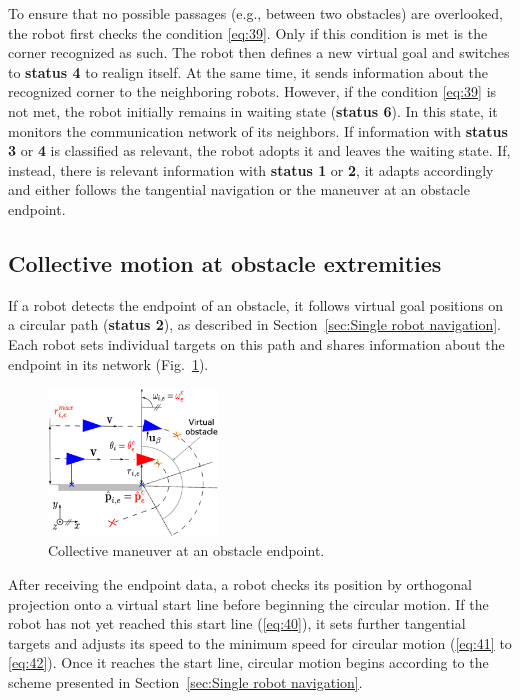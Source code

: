 \documentclass[conference]{IEEEtran}
\begin{document}
To ensure that no possible passages 
(e.g., between two obstacles) are overlooked, the robot first checks the 
condition \eqref{eq:39}. Only if this condition is met is the corner recognized as such.
The robot then defines a new virtual goal and switches to \textbf{status 4} 
to realign itself. At the same time, it sends information about the recognized corner 
to the neighboring robots.
However, if the condition \eqref{eq:39} is not met, the robot initially remains in 
waiting state (\textbf{status 6}). In this state, it monitors the communication network 
of its neighbors. If information with \textbf{status 3} or \textbf{4} is classified as relevant,
 the robot adopts it and leaves the waiting state. If, 
instead, there is relevant information with \textbf{status 1} or \textbf{2}, it adapts accordingly 
and either follows the tangential navigation or the maneuver at an obstacle endpoint.

\subsection*{Collective motion at obstacle extremities}
If a robot detects the endpoint of an obstacle, it follows virtual goal positions 
on a circular path (\textbf{status 2}), as described in 
Section~\ref{sec:Single robot navigation}. Each 
robot sets individual targets on this path and shares information about the 
endpoint in its network (Fig.~\ref{fig:Collective maneuver at an obstacle endpoint}).

\begin{figure}[h]
    \centering
    \includegraphics[width=0.4\textwidth]{Pictures/Collective maneuver at an obstacle endpoint.png}
    \caption{Collective maneuver at an obstacle endpoint.}
    \label{fig:Collective maneuver at an obstacle endpoint}
\end{figure}

After receiving the endpoint data, a robot checks its 
position by orthogonal projection onto a virtual start line 
before beginning the circular motion. If the robot has not yet reached this start line 
(\eqref{eq:40}), it sets further tangential targets and adjusts its 
speed to the minimum speed for circular motion 
(\eqref{eq:41} to \eqref{eq:42}). Once it reaches the start line, circular motion begins 
according to the scheme presented in 
Section~\ref{sec:Single robot navigation}.
\end{document}
